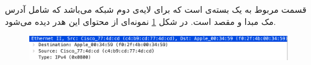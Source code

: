 \Question{}
{
	قسمت 
	مربوط به یک بسته‌ی 
	است که برای لایه‌ی دوم شبکه‌ می‌باشد که شامل آدرس مک مبدا و مقصد است. در شکل
	\ref{fig:frame}
	نمونه‌ای از محتوای این هدر دیده می‌شود.
	
	\begin{figure}[H]
		\centering
		\includegraphics[width=0.7\columnwidth]{Images/frame}
		\label{fig:frame}
	\end{figure}
}